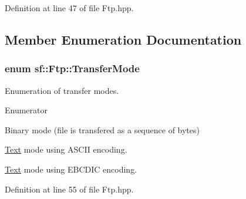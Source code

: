 Definition at line 47 of file Ftp.\-hpp.



\subsection{Member Enumeration Documentation}
\hypertarget{classsf_1_1Ftp_a1cd6b89ad23253f6d97e6d4ca4d558cb}{
\subsubsection[{Transfer\-Mode}]{\setlength{\rightskip}{0pt plus 5cm}enum {\bf sf\-::\-Ftp\-::\-Transfer\-Mode}}}\label{classsf_1_1Ftp_a1cd6b89ad23253f6d97e6d4ca4d558cb}


Enumeration of transfer modes. 

\begin{Desc}
\item[Enumerator]\par
\begin{description}
\item[{\em 
\hypertarget{classsf_1_1Ftp_a1cd6b89ad23253f6d97e6d4ca4d558cba6f253b362639fb5e059dc292762a21ee}{Binary}\label{classsf_1_1Ftp_a1cd6b89ad23253f6d97e6d4ca4d558cba6f253b362639fb5e059dc292762a21ee}
}]Binary mode (file is transfered as a sequence of bytes) \item[{\em 
\hypertarget{classsf_1_1Ftp_a1cd6b89ad23253f6d97e6d4ca4d558cbac9e544a22dce8ef3177449cb235d15c2}{Ascii}\label{classsf_1_1Ftp_a1cd6b89ad23253f6d97e6d4ca4d558cbac9e544a22dce8ef3177449cb235d15c2}
}]\hyperlink{classsf_1_1Text}{Text} mode using A\-S\-C\-I\-I encoding. \item[{\em 
\hypertarget{classsf_1_1Ftp_a1cd6b89ad23253f6d97e6d4ca4d558cbabb1e34435231e73c96534c71090be7f4}{Ebcdic}\label{classsf_1_1Ftp_a1cd6b89ad23253f6d97e6d4ca4d558cbabb1e34435231e73c96534c71090be7f4}
}]\hyperlink{classsf_1_1Text}{Text} mode using E\-B\-C\-D\-I\-C encoding. \end{description}
\end{Desc}


Definition at line 55 of file Ftp.\-hpp.



